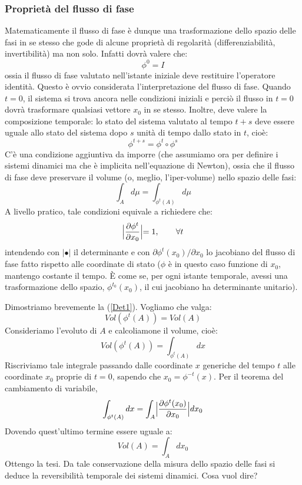 \documentclass[a4paper,openany]{article}
\begin{document}
	\subsubsection{Proprietà del flusso di fase}
	Matematicamente il flusso di fase è dunque una trasformazione dello spazio delle fasi in se stesso che gode di alcune proprietà di regolarità (differenziabilità, invertibilità) ma non solo. Infatti dovrà valere che:
	\begin{equation}
		\phi^{0} = I
	\end{equation}
	ossia il flusso di fase valutato nell'istante iniziale deve restituire l'operatore identità. Questo è ovvio considerata l'interpretazione del flusso di fase. Quando $t=0$, il sistema si trova ancora nelle condizioni iniziali e perciò il flusso in $t=0$ dovrà trasformare qualsiasi vettore $x_{0}$ in se stesso. Inoltre, deve valere la composizione temporale: lo stato del sistema valutato al tempo $t+s$ deve essere uguale allo stato del sistema dopo $s$ unità di tempo dallo stato in $t$, cioè:
	\begin{equation}
		\phi^{t+s} = \phi^{t} \circ \phi^{s}
	\end{equation}
	C'è una condizione aggiuntiva da imporre (che assumiamo ora per definire i sistemi dinamici ma che è implicita nell'equazione di Newton), ossia che il flusso di fase deve preservare il volume (o, meglio, l'iper-volume) nello spazio delle fasi:
	\begin{equation}
		\int_{A}d\mu = \int_{\phi^{t}(A)}d\mu
	\end{equation}
	A livello pratico, tale condizioni equivale a richiedere che:
	\begin{equation}
		\Bigl|\dfrac{\partial \phi^{t}}{\partial x_{0}}\Bigl| = 1, \>\>\>\>\>\>\>\>\> \forall t
		\label{Det1}
	\end{equation}
	intendendo con $|\bullet|$ il determinante e con $\partial \phi^{t}(x_{0})/\partial x_{0}$ lo jacobiano del flusso di fase fatto rispetto alle coordinate di stato ($\phi$ è in questo caso funzione di $x_{0}$, mantengo costante il tempo. È come se, per ogni istante temporale, avessi una trasformazione dello spazio, $\phi^{t_{0}}(x_{0})$, il cui jacobiano ha determinante unitario).
	
	Dimostriamo brevemente la (\ref{Det1}). Vogliamo che valga:
	$$
	Vol(\phi^{t}(A)) = Vol(A)
	$$
	Consideriamo l'evoluto di $A$ e calcoliamone il volume, cioè:
	$$
	Vol(\phi^{t}(A)) = \int_{\phi^{t}(A)}dx
	$$
	Riscriviamo tale integrale passando dalle coordinate $x$ generiche del tempo $t$ alle coordinate $x_{0}$ proprie di $t=0$, sapendo che $x_{0} = \phi^{-t}(x)$. Per il teorema del cambiamento di variabile,
	$$
	\int_{\phi^{t}(A)}dx = \int_{A} \Bigl|\dfrac{\partial \phi^{t}(x_{0})}{\partial x_{0}}\Bigl| dx_{0}
	$$
	Dovendo quest'ultimo termine essere uguale a:
	$$
	Vol(A) = \int_{A} dx_{0}
	$$
	Ottengo la tesi.
	Da tale conservazione della misura dello spazio delle fasi si deduce la reversibilità temporale dei sistemi dinamici. Cosa vuol dire? 
	
\end{document}
